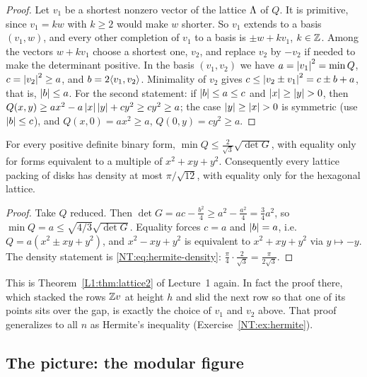 \begin{proof}
Let $v_1$ be a shortest nonzero vector of the lattice $\Lambda$ of $Q$. It is primitive, since
$v_1=kw$ with $k\ge2$ would make $w$ shorter. So $v_1$ extends to a basis $(v_1,w)$, and every other
completion of $v_1$ to a basis is $\pm w+kv_1$, $k\in\mathbb{Z}$. Among the vectors $w+kv_1$ choose a shortest
one, $v_2$, and replace $v_2$ by $-v_2$ if needed to make the determinant positive. In the basis
$(v_1,v_2)$ we have $a=\left\lvert v_1 \right\rvert^2=\min Q$, $c=\left\lvert v_2 \right\rvert^2\ge a$, and $b=2\langle v_1, v_2\rangle$. Minimality
of $v_2$ gives $c\le\left\lvert v_2\pm v_1 \right\rvert^2=c\pm b+a$, that is, $\left\lvert b \right\rvert\le a$. For the second statement:
if $\left\lvert b \right\rvert\le a\le c$ and $\left\lvert x \right\rvert\ge\left\lvert y \right\rvert>0$, then
$Q(x,y)\ge a x^2-a\left\lvert x \right\rvert\left\lvert y \right\rvert+cy^2\ge cy^2\ge a$; the case $\left\lvert y \right\rvert\ge\left\lvert x \right\rvert>0$ is symmetric
(use $\left\lvert b \right\rvert\le c$), and $Q(x,0)=ax^2\ge a$, $Q(0,y)=cy^2\ge a$.
\end{proof}

\begin{theorem}[Lagrange; $\gamma_2=2/\sqrt3$]\label{NT:thm:gamma2}
For every positive definite binary form, $\min Q\le\frac{2}{\sqrt3}\sqrt{\det G}$, with equality only
for forms equivalent to a multiple of $x^2+xy+y^2$. Consequently every lattice packing of disks has
density at most $\pi/\sqrt{12}$, with equality only for the hexagonal lattice.
\end{theorem}

\begin{proof}
Take $Q$ reduced. Then $\det G=ac-\tfrac{b^2}4\ge a^2-\tfrac{a^2}4=\tfrac34a^2$, so
$\min Q=a\le\sqrt{4/3}\sqrt{\det G}$. Equality forces $c=a$ and $\left\lvert b \right\rvert=a$, i.e.\
$Q=a(x^2\pm xy+y^2)$, and $x^2-xy+y^2$ is equivalent to $x^2+xy+y^2$ via $y\mapsto-y$. The density
statement is \eqref{NT:eq:hermite-density}: $\frac{\pi}{4}\cdot\frac{2}{\sqrt3}=\frac{\pi}{2\sqrt3}$.
\end{proof}

This is Theorem~\ref{L1:thm:lattice2} of Lecture~1 again. In fact the proof there, which stacked the
rows $\mathbb{Z} v$ at height $h$ and slid the next row so that one of its points sits over the gap, is
exactly the choice of $v_1$ and $v_2$ above. That proof generalizes to all $n$ as Hermite's inequality
(Exercise~\ref{NT:ex:hermite}).

\subsection*{The picture: the modular figure}

